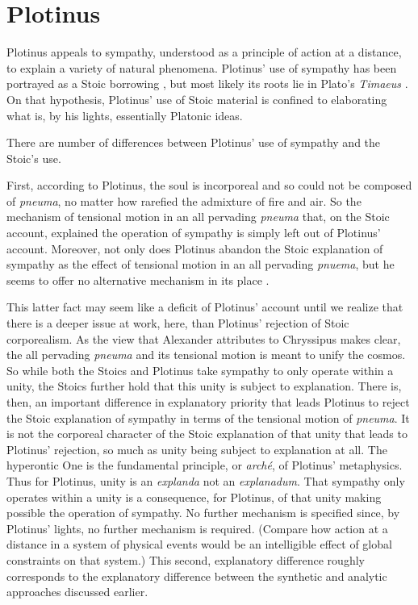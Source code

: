 
\section{Plotinus} %
\label{sec:plotinus}

Plotinus appeals to sympathy, understood as a principle of action at a distance, to explain a variety of natural phenomena. Plotinus' use of sympathy has been portrayed as a Stoic borrowing \citep{Emilsson:1988uq,Ierodiakonou:2006gf}, but most likely its roots lie in Plato's \emph{Timaeus} \citep{Emilsson:2015wf}. On that hypothesis, Plotinus' use of Stoic material is confined to elaborating what is, by his lights, essentially Platonic ideas.

There are number of differences between Plotinus' use of sympathy and the Stoic's use.

First, according to Plotinus, the soul is incorporeal and so could not be composed of \emph{pneuma}, no matter how rarefied the admixture of fire and air. So the mechanism of tensional motion in an all pervading \emph{pneuma} that, on the Stoic account, explained the operation of sympathy is simply left out of Plotinus' account. Moreover, not only does Plotinus abandon the Stoic explanation of sympathy as the effect of tensional motion in an all pervading \emph{pnuema}, but he seems to offer no alternative mechanism in its place \citep[48]{Emilsson:1988uq}.

This latter fact may seem like a deficit of Plotinus' account until we realize that there is a deeper issue at work, here, than Plotinus' rejection of Stoic corporealism. As the view that Alexander attributes to Chryssipus makes clear, the all pervading \emph{pneuma} and its tensional motion is meant to unify the cosmos. So while both the Stoics and Plotinus take sympathy to only operate within a unity, the Stoics further hold that this unity is subject to explanation. There is, then, an important difference in explanatory priority that leads Plotinus to reject the Stoic explanation of sympathy in terms of the tensional motion of \emph{pneuma}. It is not the corporeal character of the Stoic explanation of that unity that leads to Plotinus' rejection, so much as unity being subject to explanation at all. The hyperontic One is the fundamental principle, or \emph{arch\'{e}}, of Plotinus' metaphysics. Thus for Plotinus, unity is an \emph{explanda} not an \emph{explanadum}. That sympathy only operates within a unity is a consequence, for Plotinus, of that unity making possible the operation of sympathy. No further mechanism is specified since, by Plotinus' lights, no further mechanism is required. (Compare how action at a distance in a system of physical events would be an intelligible effect of global constraints on that system.) This second, explanatory difference roughly corresponds to the explanatory difference between the synthetic and analytic approaches discussed earlier.

